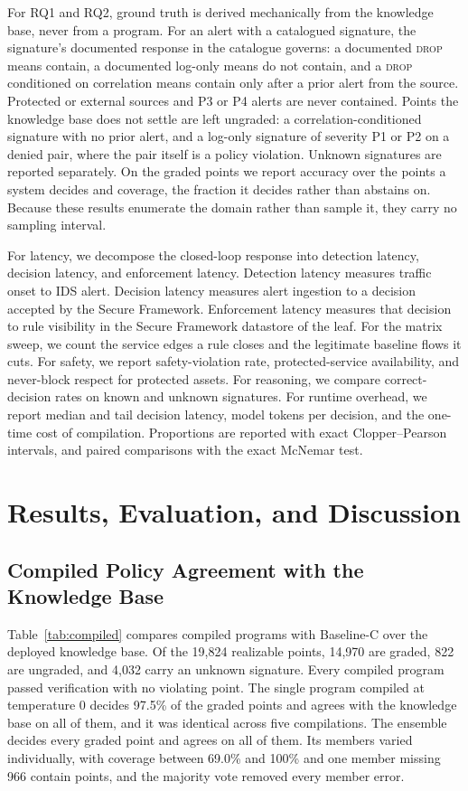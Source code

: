 \documentclass[final,5p]{elsarticle}
\begin{document}
For RQ1 and RQ2, ground truth is derived mechanically from the knowledge base, never from a program. For an alert with a catalogued signature, the signature's documented response in the catalogue governs: a documented \textsc{drop} means contain, a documented log-only means do not contain, and a \textsc{drop} conditioned on correlation means contain only after a prior alert from the source. Protected or external sources and P3 or P4 alerts are never contained. Points the knowledge base does not settle are left ungraded: a correlation-conditioned signature with no prior alert, and a log-only signature of severity P1 or P2 on a denied pair, where the pair itself is a policy violation. Unknown signatures are reported separately. On the graded points we report accuracy over the points a system decides and coverage, the fraction it decides rather than abstains on. Because these results enumerate the domain rather than sample it, they carry no sampling interval.

For latency, we decompose the closed-loop response into detection latency, decision latency, and enforcement latency. Detection latency measures traffic onset to IDS alert. Decision latency measures alert ingestion to a decision accepted by the Secure Framework. Enforcement latency measures that decision to rule visibility in the Secure Framework datastore of the leaf. For the matrix sweep, we count the service edges a rule closes and the legitimate baseline flows it cuts. For safety, we report safety-violation rate, protected-service availability, and never-block respect for protected assets. For reasoning, we compare correct-decision rates on known and unknown signatures. For runtime overhead, we report median and tail decision latency, model tokens per decision, and the one-time cost of compilation. Proportions are reported with exact Clopper--Pearson intervals, and paired comparisons with the exact McNemar test.
\section{Results, Evaluation, and Discussion}
\label{sec:results_discussion}

\subsection{Compiled Policy Agreement with the Knowledge Base}
\label{sec:compiled_fidelity}

Table~\ref{tab:compiled} compares compiled programs with Baseline-C over the deployed knowledge base. Of the 19,824 realizable points, 14,970 are graded, 822 are ungraded, and 4,032 carry an unknown signature. Every compiled program passed verification with no violating point. The single program compiled at temperature 0 decides 97.5\% of the graded points and agrees with the knowledge base on all of them, and it was identical across five compilations. The ensemble decides every graded point and agrees on all of them. Its members varied individually, with coverage between 69.0\% and 100\% and one member missing 966 contain points, and the majority vote removed every member error.
\end{document}
